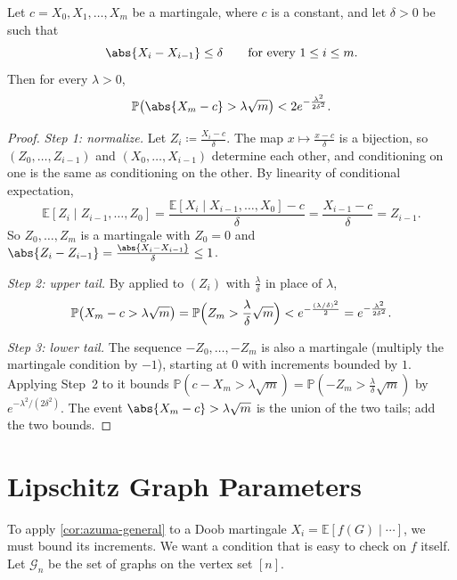 \begin{corollary}\label{cor:azuma-general}
    Let \(c = X_{0}, X_{1}, \ldots, X_{m}\) be a martingale, where \(c\) is a constant, and let \(\delta > 0\) be such that
    \[
        \abs{X_{i} - X_{i-1}} \le \delta \qquad \text{for every } 1 \le i \le m .
    \]
    Then for every \(\lambda > 0\),
    \[
        \mathbb{P}\bigl( \abs{X_{m} - c} > \lambda \sqrt{m} \bigr) < 2 e^{-\frac{\lambda^{2}}{2\delta^{2}}} .
    \]
\end{corollary}

\begin{proof}
    \emph{Step 1: normalize.} Let \(Z_{i} \coloneqq \frac{X_{i} - c}{\delta}\). The map \(x \mapsto \frac{x - c}{\delta}\) is a bijection, so \((Z_{0}, \ldots, Z_{i-1})\) and \((X_{0}, \ldots, X_{i-1})\) determine each other, and conditioning on one is the same as conditioning on the other. By linearity of conditional expectation,
    \[
        \mathbb{E}[Z_{i} \mid Z_{i-1}, \ldots, Z_{0}]
        = \frac{\mathbb{E}[X_{i} \mid X_{i-1}, \ldots, X_{0}] - c}{\delta}
        = \frac{X_{i-1} - c}{\delta}
        = Z_{i-1} .
    \]
    So \(Z_{0}, \ldots, Z_{m}\) is a martingale with \(Z_{0} = 0\) and \(\abs{Z_{i} - Z_{i-1}} = \frac{\abs{X_{i} - X_{i-1}}}{\delta} \le 1\).

    \emph{Step 2: upper tail.} By  applied to \((Z_{i})\) with \(\frac{\lambda}{\delta}\) in place of \(\lambda\),
    \[
        \mathbb{P}\bigl( X_{m} - c > \lambda \sqrt{m} \bigr)
        = \mathbb{P}\Bigl( Z_{m} > \frac{\lambda}{\delta} \sqrt{m} \Bigr)
        < e^{-\frac{(\lambda/\delta)^{2}}{2}}
        = e^{-\frac{\lambda^{2}}{2\delta^{2}}} .
    \]

    \emph{Step 3: lower tail.} The sequence \(-Z_{0}, \ldots, -Z_{m}\) is also a martingale (multiply the martingale condition by \(-1\)), starting at \(0\) with increments bounded by \(1\). Applying Step~2 to it bounds \(\mathbb{P}(c - X_{m} > \lambda \sqrt{m}) = \mathbb{P}(-Z_{m} > \frac{\lambda}{\delta} \sqrt{m})\) by \(e^{-\lambda^{2}/(2\delta^{2})}\). The event \(\abs{X_{m} - c} > \lambda \sqrt{m}\) is the union of the two tails; add the two bounds.
\end{proof}

\section{Lipschitz Graph Parameters}\label{sec:lipschitz}

To apply \autoref{cor:azuma-general} to a Doob martingale \(X_{i} = \mathbb{E}[f(G) \mid \cdots]\), we must bound its increments. We want a condition that is easy to check on \(f\) itself. Let \(\mathcal{G}_{n}\) be the set of graphs on the vertex set \([n]\).

